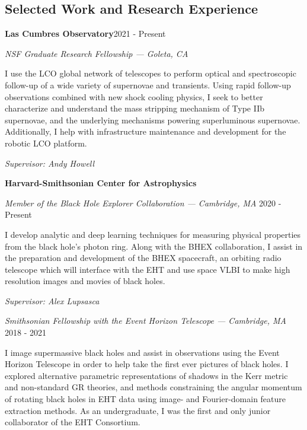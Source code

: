 \documentclass[margin,line]{res}
\begin{document}
\begin{resume}
\vspace{+.4cm}
\section{\sc Selected Work and Research Experience}
{\bf Las Cumbres Observatory}\hfill 2021 - Present


\vspace{-.4cm}
{\em NSF Graduate Research Fellowship --- Goleta, CA}

\begin{changemargin}{-0.0cm}{2.5cm} 
I use the LCO global network of telescopes to perform optical and spectroscopic follow-up of a wide variety of supernovae and transients. Using rapid follow-up observations combined with new shock cooling physics, I seek to better characterize and understand the mass stripping mechanism of Type IIb supernovae, and the underlying mechanisms powering superluminous supernovae. Additionally, I help with infrastructure maintenance and development for the robotic LCO platform.

\textit{Supervisor: Andy Howell}
\end{changemargin}



{\bf Harvard-Smithsonian Center for Astrophysics}

\vspace{-.4cm}
{\em Member of the Black Hole Explorer Collaboration --- Cambridge, MA} \hfill 2020 - Present

\begin{changemargin}{-0.0cm}{2.5cm} 
I develop analytic and deep learning techniques for measuring physical properties from the black hole's photon ring. Along with the BHEX collaboration, I assist in the preparation and development of the BHEX spacecraft, an orbiting radio telescope which will interface with the EHT and use space VLBI to make high resolution images and movies of black holes.

\textit{Supervisor: Alex Lupsasca}
\end{changemargin}


{\em Smithsonian Fellowship with the Event Horizon Telescope --- Cambridge, MA} \hfill 2018 - 2021

\begin{changemargin}{-0.0cm}{2.5cm} 
I image supermassive black holes and assist in observations using the Event Horizon Telescope in order to help take the first ever pictures of black holes. I explored alternative parametric representations of shadows in the Kerr metric and non-standard GR theories, and methods constraining the angular momentum of rotating black holes in EHT data using image- and Fourier-domain feature extraction methods. As an undergraduate, I was the first and only junior collaborator of the EHT Consortium. 


\end{changemargin}
\end{resume}
\end{document}
